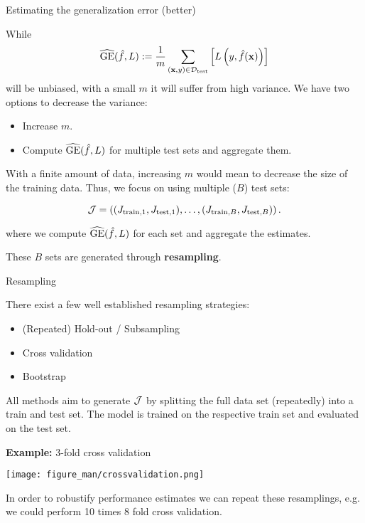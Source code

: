 \documentclass[11pt,compress,t,notes=noshow, xcolor=table]{beamer}
\begin{document}
\begin{vbframe}{Estimating the generalization error (better)}

While  $$\widehat{\mathrm{GE}}(\hat{f}, L) := \frac{1}{m}\sum_{(\mathbf{x}, y) \in \mathcal{D}_{\text{test}}} \left[ L\left(y, \hat{f}(\mathbf{x})\right) \right]$$ will be unbiased, with a small $m$ it will suffer from high variance.
We have two options to decrease the variance:

\begin{itemize}
\item Increase $m$.
\item Compute $\widehat{\mathrm{GE}}(\hat{f}, L)$ for multiple test sets and aggregate them.
\end{itemize}

With a finite amount of data, increasing $m$ would mean to decrease the size of the training data.
Thus, we focus on using multiple ($B$) test sets: 

$$\mathcal{J} = \left((J_{\mathrm{train},1}, J_{\mathrm{test},1}),\dots,(J_{\mathrm{train},B}, J_{\mathrm{test},B})\right).$$

where we compute $\widehat{\mathrm{GE}}(\hat{f}, L)$ for each set and aggregate the estimates.

These $B$ sets are generated through \textbf{resampling}.


\end{vbframe}

\begin{vbframe}{Resampling}

There exist a few well established resampling strategies:

\begin{itemize}
\item (Repeated) Hold-out / Subsampling
\item Cross validation
\item Bootstrap
\end{itemize}

All methods aim to generate $\mathcal{J}$ by splitting the full data set (repeatedly) into a train and test set.
The model is trained on the respective train set and evaluated on the test set.

\textbf{Example:} 3-fold cross validation

\begin{center}
\texttt{[image: figure\_man/crossvalidation.png]}
\end{center}


In order to robustify performance estimates we can repeat these resamplings, e.g. we could perform 10 times 8 fold cross validation.

\end{vbframe}





\endlecture
\end{document}

